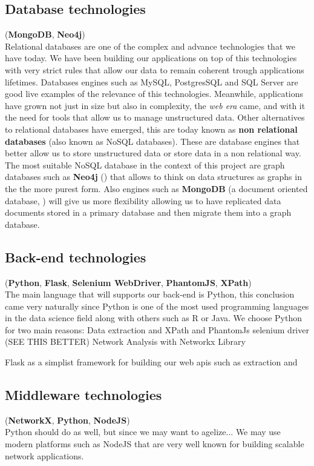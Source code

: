 \subsection{Database technologies}
(\textbf{MongoDB}, \textbf{Neo4j})\\
Relational databases are one of the complex and advance technologies that we have today. We have been building our applications on top of this technologies with very strict rules that allow our data to remain coherent trough applications lifetimes. Databases engines such as MySQL, PostgresSQL and SQL Server are good live examples of the relevance of this technologies. Meanwhile, applications have grown not just in size but also in complexity, the \textit{web era} came, and with it the need for tools that allow us to manage unstructured data. Other alternatives to relational databases have emerged, this are today known as \textbf{non relational databases} (also known as NoSQL databases). These are database engines that better allow us to store unstructured data or store data in a non relational way. The most suitable NoSQL database in the context of this project are graph databases such as \textbf{Neo4j} (\cite{developers2012neo4j}) that allows to think on data structures as graphs in the the more purest form. Also engines such as \textbf{MongoDB} (a document oriented database, \cite{mongodb}) will give us more flexibility allowing us to have replicated data documents stored in a primary database and then migrate them into a graph database.

\subsection{Back-end technologies}
(\textbf{Python}, \textbf{Flask}, \textbf{Selenium WebDriver}, \textbf{PhantomJS}, \textbf{XPath})\\
The main language that will supports our back-end is Python, this conclusion came very naturally since Python is one of the most used programming languages in the data
science field along with others such as R or Java. We choose Python for two main reasons:
Data extraction and XPath and PhantomJs selenium driver (SEE THIS BETTER)
Network Analysis with Networkx Library

Flask as a simplist framework for building our web \glspl{api} such as extraction and

\subsection{Middleware technologies}
(\textbf{NetworkX}, \textbf{Python}, \textbf{NodeJS})\\
Python should do as well, but since we may want to agelize... We may use modern platforms such as NodeJS that are very well known for
building scalable network applications.

